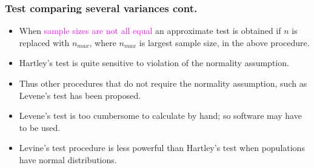 \documentclass[xcolor=dvipsnames,12pt]{beamer}
\begin{document}
\begin{frame}
\frametitle{Test comparing several variances cont.}
\begin{itemize}
\item  When {\textcolor{magenta}{sample sizes are not all equal}} an approximate test is
obtained if $n$ is replaced with $n_{max}$, where  $n_{max}$ is
largest sample size, in the above procedure.
\item Hartley's test is quite sensitive to violation of the normality
assumption. 
\item Thus other procedures that do not require the
normality assumption, such as Levene's test has been proposed.
\item  Levene's test is too cumbersome to
calculate by hand; so software may have to be used.  
\item Levine's  test
procedure is less powerful than Hartley's test when populations have
normal distributions.
\end{itemize}
\end{frame}
\end{document}
